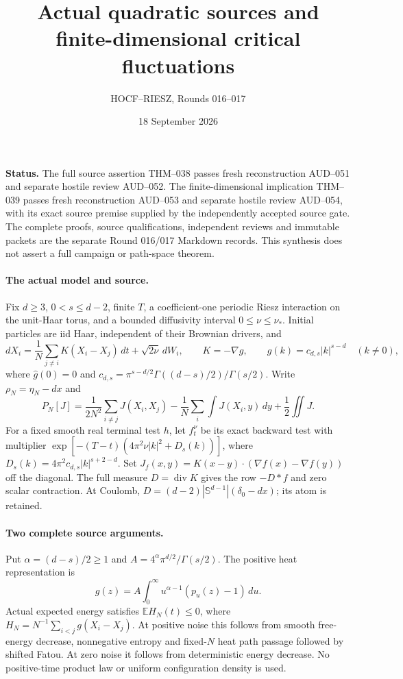 \documentclass[10pt]{article}
\newcommand{\E}{\mathbb E}
\begin{document}
\title{Actual quadratic sources and finite-dimensional critical fluctuations}
\author{HOCF--RIESZ, Rounds 016--017}
\date{18 September 2026}
\maketitle
\noindent\textbf{Status.} The full source assertion THM--038 passes fresh reconstruction AUD--051 and separate hostile review AUD--052. The finite-dimensional implication THM--039 passes fresh reconstruction AUD--053 and separate hostile review AUD--054, with its exact source premise supplied by the independently accepted source gate. The complete proofs, source qualifications, independent reviews and immutable packets are the separate Round 016/017 Markdown records. This synthesis does not assert a full campaign or path-space theorem.

\paragraph{The actual model and source.}
Fix $d\ge3$, $0<s\le d-2$, finite $T$, a coefficient-one periodic Riesz interaction on the unit-Haar torus, and a bounded diffusivity interval $0\le\nu\le\nu_*$. Initial particles are iid Haar, independent of their Brownian drivers, and
\[
 dX_i=\frac1N\sum_{j\ne i}K(X_i-X_j)\,dt+\sqrt{2\nu}\,dW_i,
 \qquad K=-\nabla g,
 \qquad \widehat g(k)=c_{d,s}|k|^{s-d}\quad(k\ne0),
\]
where $\widehat g(0)=0$ and
$c_{d,s}=\pi^{s-d/2}\Gamma((d-s)/2)/\Gamma(s/2)$.
Write $\rho_N=\eta_N-dx$ and
\[
 P_N[J]=\frac1{2N^2}\sum_{i\ne j}J(X_i,X_j)
 -\frac1N\sum_i\int J(X_i,y)\,dy+\frac12\iint J.
\]
For a fixed smooth real terminal test $h$, let $f_t^\nu$ be its exact backward test with multiplier
$\exp[-(T-t)(4\pi^2\nu|k|^2+D_s(k))]$, where
$D_s(k)=4\pi^2c_{d,s}|k|^{s+2-d}$. Set
$J_f(x,y)=K(x-y)\cdot(\nabla f(x)-\nabla f(y))$ off the diagonal.
The full measure $D=\operatorname{div}K$ gives the row $-D*f$ and zero scalar contraction. At Coulomb,
$D=(d-2)|\mathbb S^{d-1}|(\delta_0-dx)$; its atom is retained.

\paragraph{Two complete source arguments.}
Put $\alpha=(d-s)/2\ge1$ and $A=4^\alpha\pi^{d/2}/\Gamma(s/2)$. The positive heat representation is
\[
 g(z)=A\int_0^\infty u^{\alpha-1}(p_u(z)-1)\,du.
\]
Actual expected energy satisfies $\E H_N(t)\le0$, where
$H_N=N^{-1}\sum_{i<j}g(X_i-X_j)$.
At positive noise this follows from smooth free-energy decrease, nonnegative entropy and fixed-$N$ heat path passage followed by shifted Fatou. At zero noise it follows from deterministic energy decrease. No positive-time product law or uniform configuration density is used.
\end{document}
